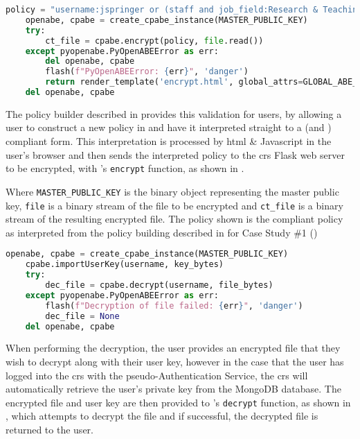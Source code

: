 \begin{lstlisting}[language=python, float, caption={Python code showing the encryption of a file using the \PyOpenABE library.}, label=lst:python_encrypt]
    policy = "username:jspringer or (staff and job_field:Research & Teaching) or (student and student_level = 2 and (enrolled_course:2001 and enrolled_course:2003 and enrolled_course:2007))"
    openabe, cpabe = create_cpabe_instance(MASTER_PUBLIC_KEY)
    try:
        ct_file = cpabe.encrypt(policy, file.read())
    except pyopenabe.PyOpenABEError as err:
        del openabe, cpabe
        flash(f"PyOpenABEError: {err}", 'danger')
        return render_template('encrypt.html', global_attrs=GLOBAL_ABE_ATTRS)
    del openabe, cpabe
\end{lstlisting}

The policy builder described in  provides this validation for users, by allowing a user to construct a new policy in \thePolicyLang and have it interpreted straight to a \PyOpenABE (and \OpenABE) compliant form. This interpretation is processed by \acrshort{html} \& Javascript in the user's browser and then sends the interpreted policy to the \acrshort{crs} Flask web server to be encrypted, with \PyOpenABE's \texttt{encrypt} function, as shown in .

Where \texttt{MASTER\_PUBLIC\_KEY} is the binary object representing the master public key, \texttt{file} is a binary stream of the file to be encrypted and \texttt{ct\_file} is a binary stream of the resulting encrypted file. The policy shown is the \PyOpenABE compliant policy as interpreted from the policy building described in  for Case Study \#1 ()

\begin{lstlisting}[language=python, float, caption={Python code showing the decryption of an encrypted file using the \PyOpenABE library.}, label=lst:python_decrypt]
    openabe, cpabe = create_cpabe_instance(MASTER_PUBLIC_KEY)
    cpabe.importUserKey(username, key_bytes)
    try:
        dec_file = cpabe.decrypt(username, file_bytes)
    except pyopenabe.PyOpenABEError as err:
        flash(f"Decryption of file failed: {err}", 'danger')
        dec_file = None
    del openabe, cpabe
\end{lstlisting}

When performing the decryption, the user provides an encrypted file that they wish to decrypt along with their user key, however in the case that the user has logged into the \acrshort{crs} with the pseudo-Authentication Service, the \acrshort{crs} will automatically retrieve the user's private key from the MongoDB database. The encrypted file and user key are then provided to \PyOpenABE's \texttt{decrypt} function, as shown in , which attempts to decrypt the file and if successful, the decrypted file is returned to the user.

